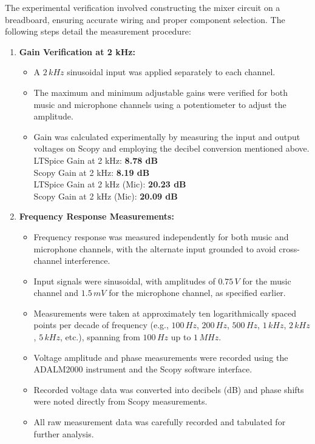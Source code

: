 \documentclass[12pt]{article}
\begin{document}
The experimental verification involved constructing the mixer circuit on a breadboard, ensuring accurate wiring and proper component selection. The following steps detail the measurement procedure:

\begin{enumerate}
	\item \textbf{Gain Verification at 2 kHz:}
	      \begin{itemize}
		      \item A $2\,kHz$ sinusoidal input was applied separately to each channel.
		      \item The maximum and minimum adjustable gains were verified for both music and microphone channels using a potentiometer to adjust the amplitude.
		      \item Gain was calculated experimentally by measuring the input and
		            output voltages on Scopy and employing the decibel conversion
		            mentioned above.\\
		            
		            LTSpice Gain at 2 kHz: \textbf{8.78 dB}\\
		            Scopy Gain at 2 kHz: \textbf{8.19 dB}\\
		            LTSpice Gain at 2 kHz (Mic): \textbf{20.23 dB}\\
		            Scopy Gain at 2 kHz (Mic): \textbf{20.09 dB}\\
	      \end{itemize}
	      
	\item \textbf{Frequency Response Measurements:}
	      \begin{itemize}
		      \item Frequency response was measured independently for both music and microphone channels, with the alternate input grounded to avoid cross-channel interference.
		      \item Input signals were sinusoidal, with amplitudes of $0.75\,V$ for
		            the music channel and $1.5\,mV$ for the microphone channel, as specified earlier.
		      \item Measurements were taken at approximately ten logarithmically spaced points per decade of frequency (e.g., $100\,Hz$, $200\,Hz$, $500\,Hz$, $1\,kHz$, $2\,kHz$, $5\,kHz$, etc.), spanning from $100\,Hz$ up to $1\,MHz$.
		      \item Voltage amplitude and phase measurements were recorded using the ADALM2000 instrument and the Scopy software interface.
		      \item Recorded voltage data was converted into decibels (dB) and phase shifts were noted directly from Scopy measurements.
		      \item All raw measurement data was carefully recorded and tabulated for further analysis.
	      \end{itemize}
\end{enumerate}
\end{document}
